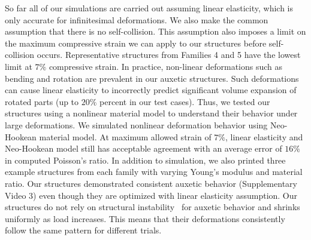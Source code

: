 So far all of our simulations are carried out assuming linear elasticity, which is only accurate for infinitesimal deformations. We also make the common assumption that there is no self-collision. This assumption also imposes a limit on the maximum compressive strain we can apply to our structures before self-collision occurs. Representative structures from Families 4 and 5 have the lowest limit at $7\%$ compressive strain.
In practice, non-linear deformations such as bending and rotation are prevalent in our auxetic structures. Such deformations can cause linear elasticity to incorrectly predict significant volume expansion of rotated parts (up to $20\%$ percent in our test cases).
Thus, we tested our structures using a nonlinear material model to understand their behavior under large deformations.
We simulated nonlinear deformation behavior using Neo-Hookean material model.
At maximum allowed strain of $7\%$, linear elasticity and Neo-Hookean model still has acceptable agreement with an average error of $16\%$ in computed Poisson's ratio. In addition to simulation, we also printed three example structures from each family with varying Young's modulus and material ratio. Our structures demonstrated consistent auxetic behavior (Supplementary Video 3) even though they are optimized with linear elasticity assumption.
Our structures do not rely on structural instability~\citep{bertoldi2010negative} for auxetic behavior and shrinks uniformly as load increases.
This means that their deformations consistently follow the same pattern for different trials.

